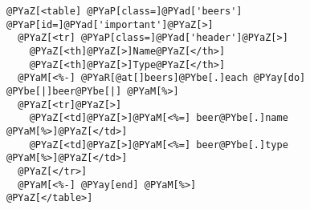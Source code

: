\begin{Verbatim}[commandchars=@\[\]]
@PYaZ[<table] @PYaP[class=]@PYad['beers'] @PYaP[id=]@PYad['important']@PYaZ[>]
  @PYaZ[<tr] @PYaP[class=]@PYad['header']@PYaZ[>]
    @PYaZ[<th]@PYaZ[>]Name@PYaZ[</th>]
    @PYaZ[<th]@PYaZ[>]Type@PYaZ[</th>]
  @PYaM[<%-] @PYaR[@at[]beers]@PYbe[.]each @PYay[do] @PYbe[|]beer@PYbe[|] @PYaM[%>]
  @PYaZ[<tr]@PYaZ[>]
    @PYaZ[<td]@PYaZ[>]@PYaM[<%=] beer@PYbe[.]name @PYaM[%>]@PYaZ[</td>]
    @PYaZ[<td]@PYaZ[>]@PYaM[<%=] beer@PYbe[.]type @PYaM[%>]@PYaZ[</td>]
  @PYaZ[</tr>]
  @PYaM[<%-] @PYay[end] @PYaM[%>]
@PYaZ[</table>]
\end{Verbatim}
